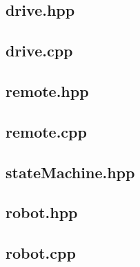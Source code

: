 \subsection{drive.hpp}

\subsection{drive.cpp}

\subsection{remote.hpp}

\subsection{remote.cpp}

\subsection{stateMachine.hpp}

\subsection{robot.hpp}

\subsection{robot.cpp}

